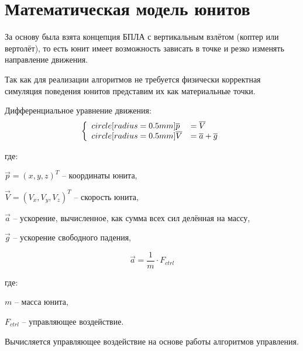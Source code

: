 \section{Математическая модель юнитов}

За основу была взята концепция БПЛА с вертикальным взлётом (коптер или вертолёт),
то есть юнит имеет возможность зависать в точке и резко изменять направление движения.

Так как для реализации алгоритмов не требуется физически корректная симуляция
поведения юнитов представим их как материальные точки.

Дифференциальное уравнение движения:
$$
\left\{
    \begin{array}{l l}
    \dot{\vec{p}}  & = \vec V \\
    \dot{\vec{V}}  & = \vec a + \vec g
    \end{array}
\right.
$$

где:

$\vec p = (x,y,z)^T$ -- координаты юнита,

$\vec V = (V_x,V_y,V_z)^T$ -- скорость юнита,

$\vec a$ -- ускорение, вычисленное, как сумма всех сил делённая на массу,

$\vec g$ -- ускорение свободного падения,

$$ \vec a = \frac{1}{m} \cdot F_{ctrl} $$

где:

$m$ -- масса юнита,

$F_{ctrl}$ -- управляющее воздействие.

Вычисляется управляющее воздействие на основе работы алгоритмов управления.


